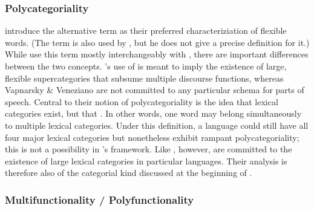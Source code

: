 \subsubsection{Polycategoriality}
\label{sec:2.3.1.2}

\textcite[4]{VapnarskyVeneziano2017a} introduce the alternative term  as their preferred characteriziation of flexible words. (The term is also used by \textcite{Carter2006}, but he does not give a precise definition for it.) While \citeauthor{VapnarskyVeneziano2017a} use this term mostly interchangeably with , there are important differences between the two concepts. \citeauthor{Hengeveld1992}'s use of  is meant to imply the existence of large, flexible supercategories that subsume multiple discourse functions, whereas Vapnarsky \& Veneziano are not committed to any particular schema for parts of speech. Central to their notion of polycategoriality is the idea that lexical categories exist, but that . In other words, one word may belong simultaneously to multiple lexical categories. Under this definition, a language could still have all four major lexical categories but nonetheless exhibit rampant polycategoriality; this is not a possibility in \citeauthor{Hengeveld1992}'s framework. Like \citeauthor{Hengeveld1992}, however, \citeauthor{VapnarskyVeneziano2017a} are committed to the existence of large lexical categories in particular languages. Their analysis is therefore also of the categorial kind discussed at the beginning of .

\subsubsection{Multifunctionality / Polyfunctionality}
\label{sec:2.3.1.3}

